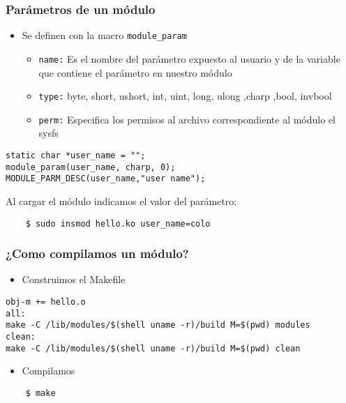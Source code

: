 \begin{frame}[fragile]
\frametitle{Parámetros de un módulo}
  \begin{itemize}
  \item Se definen con la macro \texttt{module\_param}
  \begin{itemize}
   \item \texttt{name:} Es el nombre del parámetro expuesto al usuario y de la variable que contiene el parámetro en nuestro módulo
   \item \texttt{type:} byte, short, ushort, int, uint, long, ulong ,charp ,bool, invbool
   \item \texttt{perm:} Especifica los permisos al archivo correspondiente al módulo el sysfs
  \end{itemize}

  \end{itemize}
\begin{lstlisting}
static char *user_name = "";
module_param(user_name, charp, 0);  
MODULE_PARM_DESC(user_name,"user name");
\end{lstlisting}

Al cargar el módulo indicamos el valor del parámetro:

\begin{lstlisting}
    $ sudo insmod hello.ko user_name=colo
\end{lstlisting}

\end{frame}


\frametitle{¿Como compilamos un módulo?}
\begin{frame}[fragile]
  \begin{itemize}
  \item Construimos el Makefile
  \end{itemize}
\begin{lstlisting}
obj-m += hello.o
all:
make -C /lib/modules/$(shell uname -r)/build M=$(pwd) modules
clean:
make -C /lib/modules/$(shell uname -r)/build M=$(pwd) clean
\end{lstlisting}
  \begin{itemize}
  \item Compilamos
  \end{itemize}
\begin{lstlisting}
    $ make
\end{lstlisting}

\end{frame}




